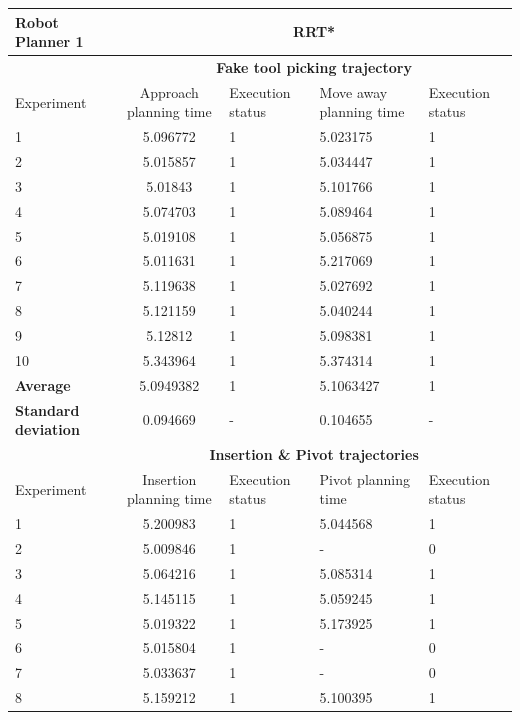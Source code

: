 \begin{table}[H]
\centering
\begin{tabular}{|p{2cm}|c|p{2cm}|p{2cm}|p{2cm}|}
\hline
Robot Planner 1           & \multicolumn{4}{c}{\textbf{RRT*}}                                                                                                 \vline \\
\hline
                          & \multicolumn{4}{c}{\textbf{Fake tool picking trajectory}}                     \vline \\
\hline
Experiment                & Approach planning time & Execution status & Move away planning time & Execution status  \\
\hline
1	& 5.096772	& 1	& 5.023175	& 1 \\
2	& 5.015857	& 1	& 5.034447	& 1 \\
3	& 5.01843	& 1	& 5.101766	& 1 \\
4	& 5.074703	& 1	& 5.089464	& 1 \\
5	& 5.019108	& 1	& 5.056875	& 1 \\
6	& 5.011631	& 1	& 5.217069	& 1 \\
7	& 5.119638	& 1	& 5.027692	& 1 \\
8	& 5.121159	& 1	& 5.040244	& 1 \\
9	& 5.12812	& 1	& 5.098381	& 1 \\
10	& 5.343964	& 1	& 5.374314	& 1 \\
\hline
\textbf{Average} & 	5.0949382	& 1	& 5.1063427	& 1 \\
\hline
\textbf{Standard deviation} & 	0.094669 &	- &	0.104655 & - \\
\hline
                          & \multicolumn{4}{c}{\textbf{Insertion \& Pivot trajectories}}                     \vline \\
\hline
Experiment                & Insertion planning time & Execution status & Pivot planning time & Execution status  \\
\hline
1 & 5.200983  & 1 &  5.044568 &  1 \\
2 & 5.009846  & 1 &  -  &  0 \\
3 & 5.064216  & 1 &  5.085314 &  1 \\
4 & 5.145115  & 1 &  5.059245 &  1 \\
5 & 5.019322  & 1 &  5.173925 &  1 \\
6 & 5.015804  & 1 &  -  &  0 \\
7 & 5.033637  & 1 &  -  &  0 \\
8 & 5.159212  & 1 &  5.100395 &  1 \\

\end{tabular}
\end{table}
